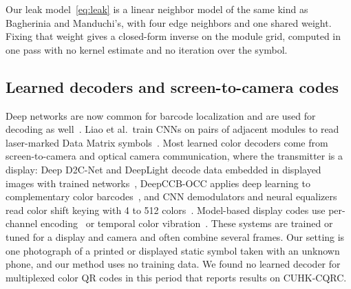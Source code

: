 Our leak model~\eqref{eq:leak} is a linear neighbor model of the same kind as Bagherinia and
Manduchi's, with four edge neighbors and one shared weight. Fixing that weight gives a
closed-form inverse on the module grid, computed in one pass with no kernel estimate and no
iteration over the symbol.

\subsection{Learned decoders and screen-to-camera codes}

Deep networks are now common for barcode localization and are used for decoding as
well~\cite{wudhikarn2022review}. Liao et al.\ train CNNs on pairs of adjacent modules to read
laser-marked Data Matrix symbols~\cite{liao2022datamatrix}. Most learned color decoders come
from screen-to-camera and optical camera communication, where the transmitter is a display:
Deep D2C-Net and DeepLight decode data embedded in displayed images with trained
networks~\cite{tamang2021deepd2c,tran2021deeplight}, DeepCCB-OCC applies deep learning to
complementary color barcodes~\cite{kim2022deepccb}, and CNN demodulators and neural
equalizers read color shift keying with 4 to 512 colors~\cite{gordillo2022cnncsk,onodera2023csk512}.
Model-based display codes use per-channel encoding~\cite{dinesh2019channelwise} or
temporal color vibration~\cite{abe2020vibration}. These systems are trained or tuned for a
display and camera and often combine several frames. Our setting is one photograph of a
printed or displayed static symbol taken with an unknown phone, and our method uses no
training data. We found no learned decoder for multiplexed color QR codes in this period
that reports results on CUHK-CQRC.
